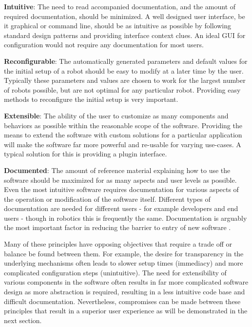 \documentclass[10pt,journal,compsoc]{joser1}
\begin{document}
{{\bf Intuitive}: The need to read accompanied documentation, and the amount of required documentation, should be minimized. A well designed user interface, be it graphical or command line, should be as intuitive as possible by following standard design patterns and providing interface context clues. An ideal GUI for configuration would not require any documentation for most users.

{\bf Reconfigurable}: The automatically generated parameters and default values for the initial setup of a robot should be easy to modify at a later time by the user. Typically these parameters and values are chosen to work for the largest number of robots possible, but are not optimal for any particular robot. Providing easy methods to reconfigure the initial setup is very important. 

{\bf Extensible}: The ability of the user to customize as many components and behaviors as possible within the reasonable scope of the software. Providing the means to extend the software with custom solutions for a particular application will make the software far more powerful and re-usable for varying use-cases. A typical solution for this is providing a plugin interface.

{\bf Documented}: The amount of reference material explaining how to use the software should be maximized for as many aspects and user levels as possible. Even the most intuitive software requires documentation for various aspects of the operation or modification of the software itself. Different types of documentation are needed for different users - for example developers and end users - though in robotics this is frequently the same. Documentation is arguably the most important factor in reducing the barrier to entry of new software \cite{forward2002relevance}.

Many of these principles have opposing objectives that require a trade off or balance be found between them. For example, the desire for transparency in the underlying mechanisms often leads to slower setup times (immediacy) and more complicated configuration steps (unintuitive). The need for extensibility of various components in the software often results in far more complicated software design as more abstraction is required, resulting in a less intuitive code base and difficult documentation. Nevertheless, compromises can be made between these principles that result in a superior user experience as will be demonstrated in the next section.

}
\end{document}
